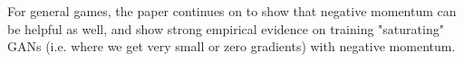 \documentclass{article}
\begin{document}
For general games, the paper continues on to show that negative momentum can be helpful as well, and show strong empirical evidence on training "saturating" GANs (i.e. where we get very small or zero gradients) with negative momentum.

%
%




\end{document}

